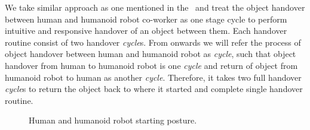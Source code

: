 We take similar approach as one mentioned in the~\cite{medina2016human, nemlekarprompt} and treat the object handover between human and humanoid robot co-worker as one stage cycle to perform intuitive and responsive handover of an object between them. Each handover routine consist of two handover \textit{cycle}s. From onwards we will refer the process of object handover between human and humanoid robot as \textit{cycle}, such that object handover from human to humanoid robot is one \textit{cycle} and return of object from humanoid robot to human as another \textit {cycle}. Therefore, it takes two full handover \textit{cycle}s to return the object back to where it started and complete single handover routine.

\begin{figure}[htbp]
		\caption{Human and humanoid robot starting posture.}
		\label{fig:halfsit}
\end{figure}

